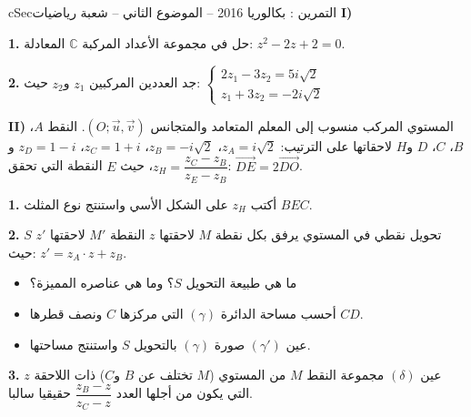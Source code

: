 \documentclass[12pt,a4paper]{article}
\newenvironment{BOX}[2]{\begin{otherlanguage}{english}\begin{arbox}{#1}{#2}}{\end{arbox}\end{otherlanguage}}
\newcounter{exo}
\newenvironment{tamrin}[1]{\stepcounter{exo}\begin{BOX}{cSec}{التمرين \theexo: #1}}{\end{BOX}}
\newenvironment{sq}{\begin{itemize}[leftmargin=2.4em,itemsep=3pt]}{\end{itemize}}
\newcommand{\qa}{\item[(أ)]}\newcommand{\qb}{\item[(ب)]}\newcommand{\qc}{\item[(جـ)]}\newcommand{\qd}{\item[(د)]}\newcommand{\qe}{\item[(هـ)]}
\newcommand{\QQ}[1]{\par\smallskip\textbf{#1.} }
\begin{document}
\begin{tamrin}{بكالوريا 2016 -- الموضوع الثاني -- شعبة رياضيات}
\textbf{I)}\QQ{1} حل في مجموعة الأعداد المركبة $\mathbb{C}$ المعادلة: $z^2-2z+2=0$.

\QQ{2} جد العددين المركبين $z_1$ و$z_2$ حيث: $\begin{cases}2z_1-3z_2=5i\sqrt2\\ z_1+3z_2=-2i\sqrt2\end{cases}$

\textbf{II)} المستوي المركب منسوب إلى المعلم المتعامد والمتجانس $\left(O;\vec u,\vec v\right)$.
النقط $A$، $B$، $C$، $D$ و$H$ لاحقاتها على الترتيب: $z_A=i\sqrt2$، $z_B=-i\sqrt2$، $z_C=1+i$، $z_D=1-i$ و$z_H=\dfrac{z_C-z_B}{z_E-z_B}$،
حيث $E$ النقطة التي تحقق: $\overrightarrow{DE}=2\overrightarrow{DO}$.

\QQ{1} أكتب $z_H$ على الشكل الأسي واستنتج نوع المثلث $BEC$.

\QQ{2} $S$ تحويل نقطي في المستوي يرفق بكل نقطة $M$ لاحقتها $z$ النقطة $M'$ لاحقتها $z'$ حيث: $z'=z_A\cdot z+z_B$.
\begin{sq}
\qa ما هي طبيعة التحويل $S$؟ وما هي عناصره المميزة؟
\qb أحسب مساحة الدائرة $(\gamma)$ التي مركزها $C$ ونصف قطرها $CD$.
\qc عين $(\gamma')$ صورة $(\gamma)$ بالتحويل $S$ واستنتج مساحتها.
\end{sq}
\QQ{3} عين $(\delta)$ مجموعة النقط $M$ من المستوي ($M$ تختلف عن $B$ و$C$) ذات اللاحقة $z$ التي يكون من أجلها العدد $\dfrac{z_B-z}{z_C-z}$ حقيقيا سالبا.
\end{tamrin}
\end{document}

